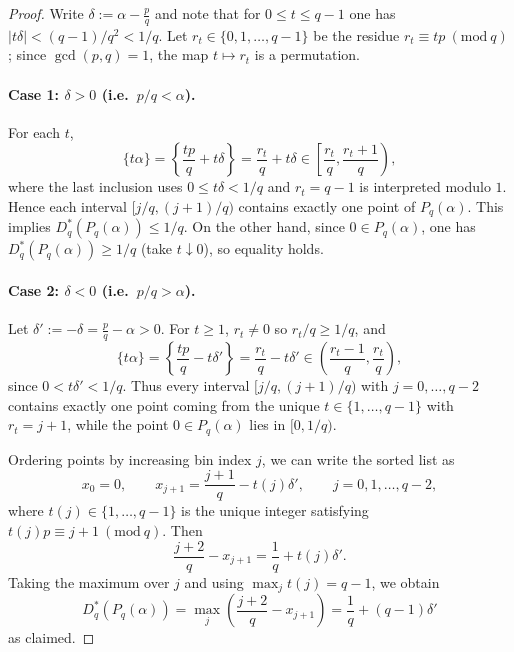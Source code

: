 \begin{proof}
Write $\delta:=\alpha-\frac{p}{q}$ and note that for $0\le t\le q-1$ one has $|t\delta|<(q-1)/q^2<1/q$. Let $r_t\in\{0,1,\ldots,q-1\}$ be the residue $r_t\equiv tp\ (\mathrm{mod}\ q)$; since $\gcd(p,q)=1$, the map $t\mapsto r_t$ is a permutation.

\paragraph{Case 1: $\delta>0$ (i.e.\ $p/q<\alpha$).}
For each $t$,
\begin{equation}
\{t\alpha\}=\left\{\frac{tp}{q}+t\delta\right\}= \frac{r_t}{q}+t\delta \in \left[\frac{r_t}{q},\frac{r_t+1}{q}\right),
\end{equation}
where the last inclusion uses $0\le t\delta<1/q$ and $r_t=q-1$ is interpreted modulo $1$. Hence each interval $[j/q,(j+1)/q)$ contains exactly one point of $P_q(\alpha)$. This implies $D_q^\ast(P_q(\alpha))\le 1/q$. On the other hand, since $0\in P_q(\alpha)$, one has $D_q^\ast(P_q(\alpha))\ge 1/q$ (take $t\downarrow 0$), so equality holds.

\paragraph{Case 2: $\delta<0$ (i.e.\ $p/q>\alpha$).}
Let $\delta':=-\delta=\frac{p}{q}-\alpha>0$. For $t\ge 1$, $r_t\neq 0$ so $r_t/q\ge 1/q$, and
\begin{equation}
\{t\alpha\}=\left\{\frac{tp}{q}-t\delta'\right\}=\frac{r_t}{q}-t\delta' \in \left(\frac{r_t-1}{q},\frac{r_t}{q}\right),
\end{equation}
since $0<t\delta'<1/q$. Thus every interval $[j/q,(j+1)/q)$ with $j=0,\ldots,q-2$ contains exactly one point coming from the unique $t\in\{1,\ldots,q-1\}$ with $r_t=j+1$, while the point $0\in P_q(\alpha)$ lies in $[0,1/q)$.

Ordering points by increasing bin index $j$, we can write the sorted list as
\begin{equation}
x_0=0,\qquad x_{j+1}=\frac{j+1}{q}-t(j)\delta',\qquad j=0,1,\ldots,q-2,
\end{equation}
where $t(j)\in\{1,\ldots,q-1\}$ is the unique integer satisfying $t(j)p\equiv j+1\ (\mathrm{mod}\ q)$. Then
\begin{equation}
\frac{j+2}{q}-x_{j+1}=\frac{1}{q}+t(j)\delta'.
\end{equation}
Taking the maximum over $j$ and using $\max_j t(j)=q-1$, we obtain
\begin{equation}
D_q^\ast(P_q(\alpha))=\max_j\left(\frac{j+2}{q}-x_{j+1}\right)=\frac{1}{q}+(q-1)\delta'
\end{equation}
as claimed.
\end{proof}

